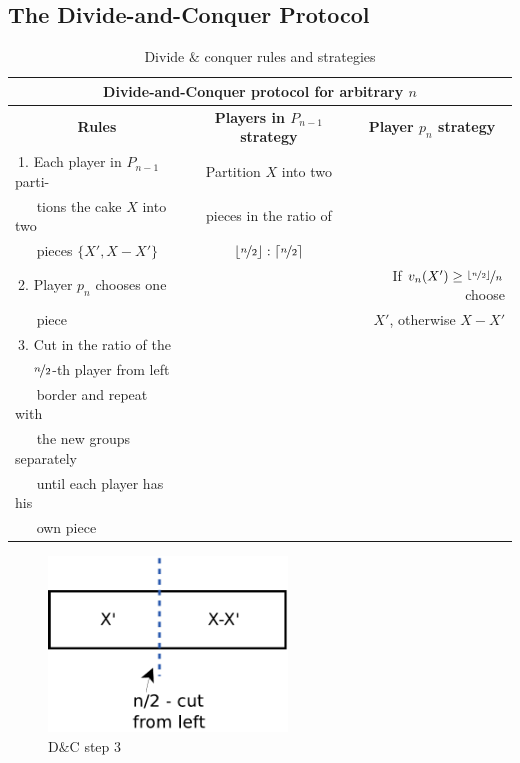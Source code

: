 \subsection{The Divide-and-Conquer Protocol}
\begin{table}[htb]
\begin{tabular*}{\textwidth}{|@{\extracolsep{\fill}}l|c|r|}
\hline
\hline
\multicolumn{3}{|c|}{\textbf{Divide-and-Conquer protocol for arbitrary $n$}}\\
\hline
\multicolumn{1}{|c|}{\textbf{Rules}}& \textbf{Players in $P_{n-1}$ strategy}&\multicolumn{1}{c|}{\textbf{Player $p_{n}$ strategy}}\\
\hline
$\:$1. Each player in $P_{n-1}$ parti-&Partition $X$ into two&\\
$\:\:\:\:\:\:\:$tions the cake $X$ into two&pieces in the ratio of&\\
$\:\:\:\:\:\:\:$pieces $\{X',X-X'\}$&$\lfloor \nicefrac{n}{2} \rfloor:\lceil \nicefrac{n}{2} \rceil$&\\
\hline
$\:$2. Player $p_n$ chooses one&&If $v_n(X') \geq \nicefrac{\lfloor \nicefrac{n}{2} \rfloor}{n}$ choose\\
$\:\:\:\:\:\:\:$piece&& $X'$, otherwise $X-X'$\\
\hline
$\:$3. Cut in the ratio of the&&\\$\:\:\:\:\:\:\nicefrac{n}{2}$-th player from left&&\\
$\:\:\:\:\:\:\:$border and repeat with&&\\
$\:\:\:\:\:\:\:$the new groups separately&&\\
$\:\:\:\:\:\:\:$until each player has his&&\\
$\:\:\:\:\:\:\:$own piece&&\\
\hline
\end{tabular*}
\caption{Divide $\&$ conquer rules and strategies}\label{dc}
\end{table}
\begin{figure}[h!]
		\centering
 		 \includegraphics[width=180pt]{bilder/dc1.pdf}
   \caption{D$\&$C step 3}
  	 \end{figure}

